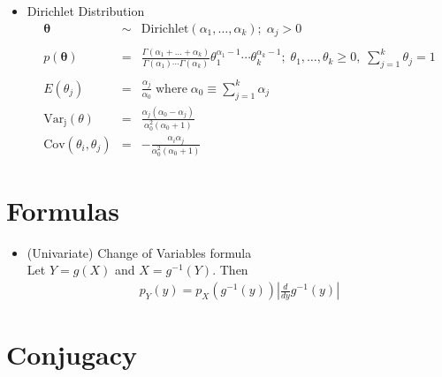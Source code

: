 \documentclass[10pt,a4paper]{article}
\begin{document}
\begin{itemize}
\bigskip

\item Dirichlet Distribution 
\begin{eqnarray*}
\bm{\theta} &\sim& \mathrm{Dirichlet}(\alpha_1,\dots,\alpha_k); \; \alpha_j > 0 \\\\
p(\bm{\theta}) &=& \frac{\Gamma(\alpha_1+\dots+\alpha_k)}{\Gamma(\alpha_1) \cdots \Gamma(\alpha_k)} \theta_1^{\alpha_1-1} \cdots \theta_k^{\alpha_k-1}; \; \theta_1,\dots,\theta_k \ge 0, \; \sum_{j=1}^k \theta_j = 1\\\\
E(\theta_j) &=& \frac{\alpha_j}{\alpha_0} \; \mathrm{where} \; \alpha_0 \equiv \sum_{j=1}^k \alpha_j \\
\mathrm{Var_j}(\theta) &=& \frac{\alpha_j (\alpha_0 - \alpha_j)}{\alpha^2_0 (\alpha_0 + 1)} \\
\mathrm{Cov}(\theta_i, \theta_j) &=& -\frac{\alpha_i \alpha_j}{\alpha_0^2 (\alpha_0+1)}
\end{eqnarray*}

\end{itemize}

\bigskip

\section*{Formulas}

\bigskip

\begin{itemize}
\item (Univariate) Change of Variables formula \\

Let $Y = g(X)$ and $X = g^{-1}(Y)$.  Then 
\begin{eqnarray*}
p_Y(y) = p_X(g^{-1}(y)) \left \vert \frac{d}{dy} g^{-1}(y) \right \vert
\end{eqnarray*}
\end{itemize}

\bigskip

\section*{Conjugacy}

\bigskip
\end{document}

